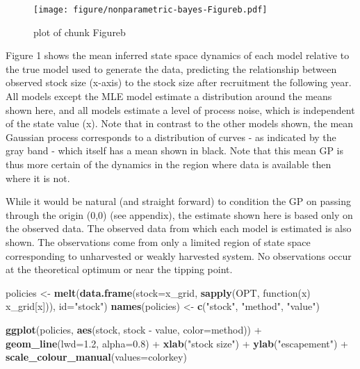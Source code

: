 \documentclass[author-year, review]{elsarticle} %
\makeatletter
\newenvironment{Shaded}{}{}
\newcommand{\KeywordTok}[1]{\textcolor[rgb]{0.00,0.44,0.13}{\textbf{{#1}}}}
\newcommand{\DataTypeTok}[1]{\textcolor[rgb]{0.56,0.13,0.00}{{#1}}}
\newcommand{\FloatTok}[1]{\textcolor[rgb]{0.25,0.63,0.44}{{#1}}}
\newcommand{\StringTok}[1]{\textcolor[rgb]{0.25,0.44,0.63}{{#1}}}
\newcommand{\NormalTok}[1]{{#1}}
\def\maxwidth{\ifdim\Gin@nat@width>\linewidth\linewidth
\else\Gin@nat@width\fi}
\let\Oldincludegraphics\includegraphics
\renewcommand{\includegraphics}[1]{\Oldincludegraphics[width=\maxwidth]{#1}}
\makeatother
\begin{document}
\begin{figure}[htbp]
\centering
\texttt{[image: figure/nonparametric-bayes-Figureb.pdf]}
\caption{plot of chunk Figureb}
\end{figure}

Figure 1 shows the mean inferred state space dynamics of each model
relative to the true model used to generate the data, predicting the
relationship between observed stock size (x-axis) to the stock size
after recruitment the following year. All models except the MLE model
estimate a distribution around the means shown here, and all models
estimate a level of process noise, which is independent of the state
value (x). Note that in contrast to the other models shown, the mean
Gaussian process corresponds to a distribution of curves - as indicated
by the gray band - which itself has a mean shown in black. Note that
this mean GP is thus more certain of the dynamics in the region where
data is available then where it is not.

While it would be natural (and straight forward) to condition the GP on
passing through the origin (0,0) (see appendix), the estimate shown here
is based only on the observed data. The observed data from which each
model is estimated is also shown. The observations come from only a
limited region of state space corresponding to unharvested or weakly
harvested system. No observations occur at the theoretical optimum or
near the tipping point.

\begin{Shaded}
\begin{Highlighting}[]
\NormalTok{policies <- }\KeywordTok{melt}\NormalTok{(}\KeywordTok{data.frame}\NormalTok{(}\DataTypeTok{stock=}\NormalTok{x_grid, }\KeywordTok{sapply}\NormalTok{(OPT, function(x) x_grid[x])), }\DataTypeTok{id=}\StringTok{"stock"}\NormalTok{)}
\KeywordTok{names}\NormalTok{(policies) <- }\KeywordTok{c}\NormalTok{(}\StringTok{"stock"}\NormalTok{, }\StringTok{"method"}\NormalTok{, }\StringTok{"value"}\NormalTok{)}

\KeywordTok{ggplot}\NormalTok{(policies, }\KeywordTok{aes}\NormalTok{(stock, stock - value, }\DataTypeTok{color=}\NormalTok{method)) +}
  \KeywordTok{geom_line}\NormalTok{(}\DataTypeTok{lwd=}\FloatTok{1.2}\NormalTok{, }\DataTypeTok{alpha=}\FloatTok{0.8}\NormalTok{) + }\KeywordTok{xlab}\NormalTok{(}\StringTok{"stock size"}\NormalTok{) + }\KeywordTok{ylab}\NormalTok{(}\StringTok{"escapement"}\NormalTok{)  +}
  \KeywordTok{scale_colour_manual}\NormalTok{(}\DataTypeTok{values=}\NormalTok{colorkey)}
\end{Highlighting}
\end{Shaded}
\end{document}
